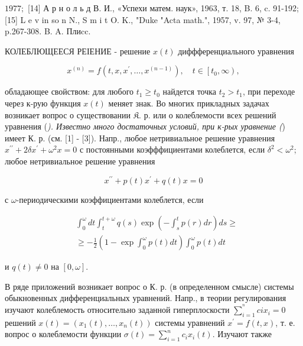 \documentclass[10pt]{article}
\begin{document}
$1977 ;$ [14] А р н о л ь д В. И., «Успехи матем. наук», 1963, т. 18, B. 6, c. 91-192; [15] L e v in so n N., S m i t O. K., "Duke "Acta math.", 1957, v. 97, № 3-4, p.267-308. B. A. Плиcc.



КОЛЕБЛЮЩЕЕСЯ РЕІЕНИЕ - решение $x(t)$ диффференциального уравнения



\[

x^{(n)}=f\left(t, x, x^{\prime}, \ldots, x^{(n-1)}\right), \quad t \in\left[t_{0}, \infty\right),

\]



обладающее свойством: для любого $t_{1} \geqslant t_{0}$ найдется точка $t_{2}>t_{1}$, при переходе через к-рую функция $x(t)$ меняет знак. Во многих прикладных задачах возникает вопрос о существовании $\mathfrak{K}$. р. или о колеблемости всех решений уравнения (\textit{). Известно много достаточных условий, при к-рых уравнение (}) имеет К. р. (см. [1] - [3]). Напр., любое нетривиальное решение уравнения $x^{\prime \prime}+2 \delta x^{\prime}+\omega^{2} x=0$ с постоянными коэфффициентами колеблется, если $\delta^{2}<\omega^{2}$; любое нетривиальное решение уравнения



\[

x^{\prime \prime}+p(t) x^{\prime}+q(t) x=0

\]



с $\omega$-периодическими коэффициентами колеблется, если



\[

\begin{aligned}

& \int_{0}^{\omega} d t \int_{t}^{t+\omega} q(s) \exp \left(-\int_{s}^{t} p(r) d r\right) d s \geqslant \\

& \geqslant-\frac{1}{2}\left(1-\exp \int_{0}^{\omega} p(t) d t\right) \int_{0}^{\omega} p(t) d t

\end{aligned}

\]



и $q(t) \neq 0$ на $[0, \omega]$.



В ряде приложений возникает вопрос о К. р. (в определенном смысле) системы обыкновенных дифференциальных уравнений. Напр., в теории регулирования изучают колеблемость относительно заданной гиперплоскости $\sum_{i=1}^{{ }^{n}} c i x_{i}=0$ решений $x(t)=\left(x_{1}(t), \ldots, x_{n}(t)\right)$ системы уравнений $x^{\prime}=f(t, x)$, т. е. вопрос о колеблемости функции $\sigma(t)=\sum_{i=1}^{n} c_{i} x_{i}(t)$. Изучают также
\end{document}
